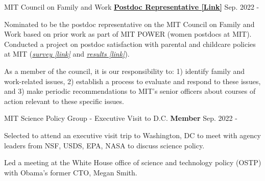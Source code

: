 

\begin{cventries}

  \cventry 
    {MIT} %
    {Council on Family and Work}
    {\href{https://drive.google.com/file/d/1KEYOxyQlJCVVjhXWzmFyOpVgB2zHHPXx/view?usp=sharing}{\textbf{Postdoc Representative [Link]}}}
    {Sep. 2022 -} %
    {
      \begin{cvitems} %
        \item {Nominated to be the postdoc representative on the MIT Council on Family and Work based on prior work as part of MIT POWER (women postdocs at MIT). Conducted a project on postdoc satisfaction with parental and childcare policies at MIT (\href{https://drive.google.com/file/d/1fMhWOel-4FEX4SDK02NLmEE5upsajKBK/view?usp=sharing}{\textit{survey [link]}} and \href{https://docs.google.com/presentation/d/1VMELasSNFhN1QjrGt7P7uAFt0IQIIH-c8I0jKGWZdzI/edit?usp=sharing}{\textit{results [link]}})}.
        \item {As a member of the council, it is our responsibility to: 1) identify family and work-related issues, 2) establish a process to evaluate and respond to these issues, and 3) make periodic recommendations to MIT's senior officers about courses of action relevant to these specific issues.}
      \end{cvitems}
    }

  \cventry 
    {MIT} %
    {Science Policy Group - Executive Visit to D.C.}
    {\textbf{Member}} %
    {Sep. 2022 -} %
    {
      \begin{cvitems} %
        \item {Selected to attend an executive visit trip to Washington, DC to meet with agency leaders from NSF, USDS, EPA, NASA to discuss science policy.}
        \item {Led a meeting at the White House office of science and technology policy (OSTP) with Obama's former CTO, Megan Smith.}
      \end{cvitems}
    }


\end{cventries}
